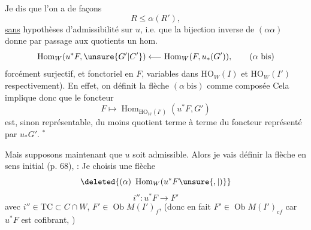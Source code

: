 Je dis que l'on a de  façons
\[
R\leq\alpha(R'),
\]
\uline{sans} hypothèses d'admissibilité sur $u$, i.e. que la bijection inverse de $(\alpha\alpha)$ donne par passage aux quotients un hom.
\[
\operatorname{Hom}_W(u^*F,\unsure{G'|C'})\longleftarrow\operatorname{Hom}_W(F,u_*(G')),
\tag*{($\alpha$ bis)}
\]
forcément surjectif, et  fonctoriel en $F$,  variables dans $\mathrm{HO}_W(I)$ et $\mathrm{HO}_W(I')$ respectivement). En effet, on définit la flèche $(\alpha\ \text{bis})$ comme composée
Cela  implique donc que le foncteur 
\[
F\longmapsto\operatorname{Hom}_{\mathrm{HO}_W(I')}(u^*F,G')
\]
est, sinon représentable, du moins quotient terme à terme du foncteur représenté par $u_*G'$. $^*$


Mais supposons maintenant que $u$ soit admissible. Alors je vais définir la flèche en sens initial (p. 68), : Je choisis une flèche
\[
\deleted{(\alpha)\ \operatorname{Hom}_W(u^*F\unsure{,|)}}
\]
\[
i'':u^*F\longrightarrow F'
\]
avec $i''\in\mathrm{TC}\subset C\cap W$, $F'\in\operatorname{Ob}M(I')_f$, (donc en fait  $F'\in\operatorname{Ob}M(I')_{cf}$ car $u^*F$ est cofibrant, )

